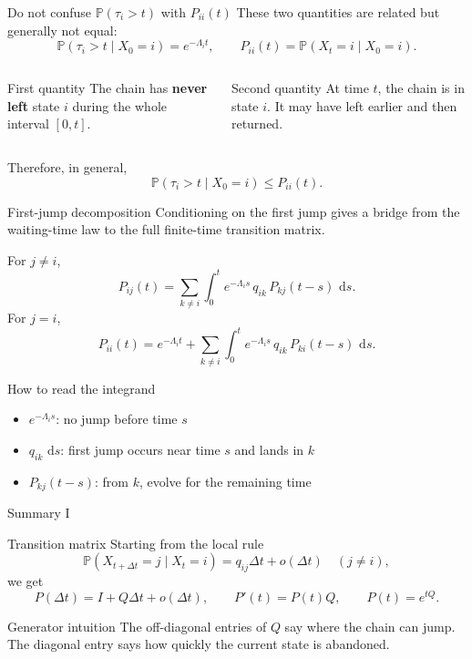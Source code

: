 \documentclass[aspectratio=169,professionalfonts]{beamer}
\newcommand{\Prob}{\mathbb{P}}
\newcommand{\dd}{\,\mathrm{d}}
\begin{document}
\begin{frame}{Do not confuse $\Prob(\tau_i>t)$ with $P_{ii}(t)$}
\small
These two quantities are related but generally not equal:
\[
\Prob(\tau_i>t\mid X_0=i)=e^{-\Lambda_i t},
\qquad
P_{ii}(t)=\Prob(X_t=i\mid X_0=i).
\]

\begin{columns}[T,totalwidth=\textwidth]
\begin{block}{First quantity}
The chain has \textbf{never left} state $i$ during the whole interval $[0,t]$.
\end{block}

\begin{alertblock}{Second quantity}
At time $t$, the chain is in state $i$.
It may have left earlier and then returned.
\end{alertblock}
\end{columns}

\vspace{0.08cm}
Therefore, in general,
\[
\Prob(\tau_i>t\mid X_0=i)\le P_{ii}(t).
\]
\end{frame}

\begin{frame}{First-jump decomposition}
\small
Conditioning on the first jump gives a bridge from the waiting-time law to the full finite-time transition matrix.

For $j\neq i$,
\[
P_{ij}(t)
=\sum_{k\neq i}\int_0^t e^{-\Lambda_i s}\,q_{ik}\,P_{kj}(t-s)\,\dd s.
\]
For $j=i$,
\[
P_{ii}(t)
=e^{-\Lambda_i t}
+\sum_{k\neq i}\int_0^t e^{-\Lambda_i s}\,q_{ik}\,P_{ki}(t-s)\,\dd s.
\]

\begin{block}{How to read the integrand}
\begin{itemize}
  \item $e^{-\Lambda_i s}$: no jump before time $s$
  \item $q_{ik}\,\dd s$: first jump occurs near time $s$ and lands in $k$
  \item $P_{kj}(t-s)$: from $k$, evolve for the remaining time
\end{itemize}
\end{block}
\end{frame}

\begin{frame}{Summary I}
\scriptsize
\begin{block}{Transition matrix}
Starting from the local rule
\[
\Prob(X_{t+\Delta t}=j\mid X_t=i)=q_{ij}\Delta t+o(\Delta t)\quad (j\neq i),
\]
we get
\[
P(\Delta t)=I+Q\Delta t+o(\Delta t),\qquad
P'(t)=P(t)Q,\qquad
P(t)=e^{tQ}.
\]
\end{block}
\begin{alertblock}{Generator intuition}
The off-diagonal entries of $Q$ say where the chain can jump. The diagonal entry says how quickly the current state is abandoned.
\end{alertblock}
\end{frame}
\end{document}
